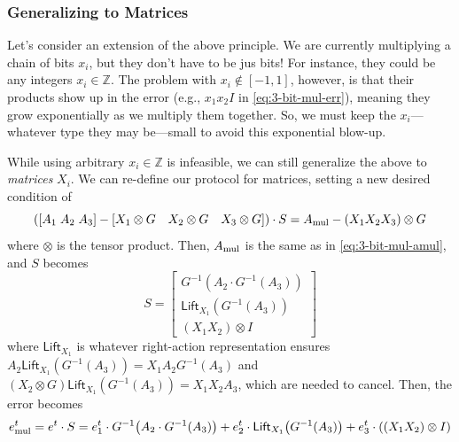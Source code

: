 \documentclass[11pt]{article}
\begin{document}
\subsubsection{Generalizing to Matrices}
\label{sec:generalizing-to-matrices}

Let's consider an extension of the above principle. We are currently multiplying a chain of bits $x_i$, but they don't have to be jus bits! For instance, they could be any integers $x_i \in \mathbb{Z}$. The problem with $x_i \not \in [-1,1]$, however, is that their products show up in the error (e.g., $x_1x_2I$ in \cref{eq:3-bit-mul-err}), meaning they grow exponentially as we multiply them together. So, we must keep the $x_i$---whatever type they may be---small to avoid this exponential blow-up.

While using arbitrary $x_i \in \mathbb{Z}$ is infeasible, we can still generalize the above to \emph{matrices} $X_i$. We can re-define our protocol for matrices, setting a new desired condition of
\begin{equation}
    \label{eq:mat-mul}
    \left([A_1 \; A_2 \; A_3] - [X_1 \otimes G \quad X_2 \otimes G \quad X_3 \otimes G] \right) \cdot S = A_{\textmd{mul}} - (X_1X_2X_3) \otimes G
\end{equation}
\noindent where $\otimes$ is the tensor product. Then, $A_{\textmd{mul}}$ is the same as in \cref{eq:3-bit-mul-amul}, and $S$ becomes
\begin{equation} %
    \label{eq:mat-mul-s}
    S = \begin{bmatrix}
        G^{-1}\!\left(A_2 \cdot G^{-1}(A_3)\right) \\
        \mathsf{Lift}_{X_1}\!\left(G^{-1}(A_3)\right) \\
        (X_1X_2)\otimes I
    \end{bmatrix}
\end{equation}
where $\mathsf{Lift}_{X_1}$ is whatever right-action representation ensures $A_2 \mathsf{Lift}_{X_1}\left( G^{-1}(A_3)\right) = X_1A_2G^{-1}(A_3)$ and $(X_2 \otimes G) \mathsf{Lift}_{X_1}\left(G^{-1}(A_3)\right) = X_1X_2A_3$, which are needed to cancel. Then, the error becomes
\begin{equation}
    \label{eq:mat-mul-err}
    e_{\textmd{mul}}^t
    =
    e^t \cdot S
    =
    e_1^t \cdot G^{-1}\!\left(A_2 \cdot G^{-1}(A_3)\right)
    +
    e_2^t \cdot \mathsf{Lift}_{X_1}\!\left(G^{-1}(A_3)\right)
    +
    e_3^t \cdot \left((X_1X_2)\otimes I\right)
\end{equation}
\end{document}
